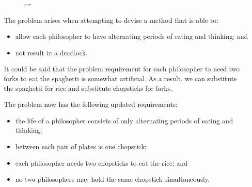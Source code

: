 \documentclass[a4paper]{systems-software}
\begin{document}
\begin{figure}[H]
  \lineskip=-\fboxrule
\end{figure}

The problem arises when attempting to devise a method that is able to:
\begin{itemize}
	\item allow each philosopher to have alternating periods of eating and thinking; and
	\item not result in a deadlock.
\end{itemize}

It could be said that the problem requirement for each philosopher to need two forks to eat the spaghetti is somewhat artificial. As a result, we can substitute the spaghetti for rice and substitute chopsticks for forks.

The problem now has the following updated requirements:
\begin{itemize}
	\item the life of a philosopher consists of only alternating periods of eating and thinking;
	\item between each pair of plates is one chopstick;
	\item each philosopher needs two chopsticks to eat the rice; and
	\item no two philosophers may hold the same chopstick simultaneously.
\end{itemize}
\end{document}
